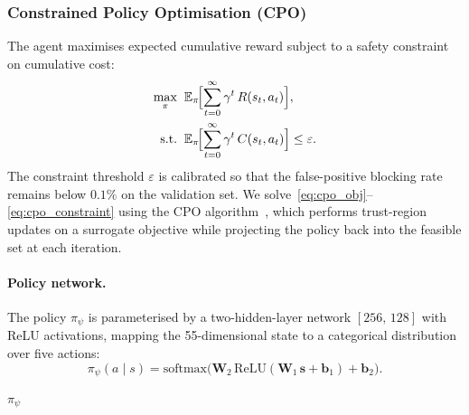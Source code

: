 \subsubsection{Constrained Policy Optimisation (CPO)}
The agent maximises expected cumulative reward subject to a safety
constraint on cumulative cost:
\begin{align}
  \max_{\pi}\;&\;
    \mathbb{E}_{\pi}\!\Bigl[\sum_{t=0}^{\infty}\gamma^t\,
    R(s_t,a_t)\Bigr], \label{eq:cpo_obj}\\
  \text{s.t.}\;&\;
    \mathbb{E}_{\pi}\!\Bigl[\sum_{t=0}^{\infty}\gamma^t\,
    C(s_t,a_t)\Bigr] \le \varepsilon. \label{eq:cpo_constraint}
\end{align}
The constraint threshold $\varepsilon$ is calibrated so that the
false-positive blocking rate remains below $0.1\%$ on the validation
set.  We solve~\eqref{eq:cpo_obj}--\eqref{eq:cpo_constraint} using the
CPO algorithm~\cite{achiam2017constrained}, which performs trust-region
updates on a surrogate objective while projecting the policy back into
the feasible set at each iteration.

\paragraph{Policy network.}
The policy $\pi_\psi$ is parameterised by a two-hidden-layer network
$[256,\,128]$ with ReLU activations, mapping the 55-dimensional state to
a categorical distribution over five actions:
\begin{equation}
  \pi_\psi(a\mid s)
  = \mathrm{softmax}\!\bigl(
    \mathbf{W}_2\,\mathrm{ReLU}(
      \mathbf{W}_1\,\mathbf{s}+\mathbf{b}_1)
    +\mathbf{b}_2
  \bigr).
  \label{eq:policy}
\end{equation}

\begin{algorithm}[t]
\DontPrintSemicolon
\SetAlgoLined
{}
\Return $\pi_\psi$\;
\caption{Constrained Policy Optimisation (CPO) for Response Agent}
\label{alg:cpo}
\end{algorithm}

